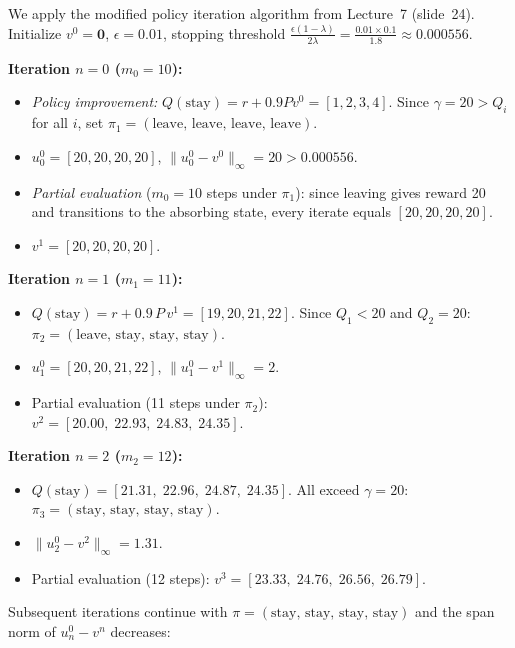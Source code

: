 \documentclass[12pt]{article}
\newcommand{\mat}[1]{\bm{#1}}
\begin{document}
We apply the modified policy iteration algorithm from Lecture~7 (slide~24). Initialize $v^0 = \mat{0}$, $\epsilon = 0.01$, stopping threshold $\frac{\epsilon(1-\lambda)}{2\lambda} = \frac{0.01 \times 0.1}{1.8} \approx 0.000556$.

\textbf{Iteration $n=0$ ($m_0 = 10$):}
\begin{itemize}[nosep]
  \item \emph{Policy improvement:} $Q(\text{stay}) = r + 0.9 P v^0 = [1, 2, 3, 4]$. Since $\gamma = 20 > Q_i$ for all $i$, set $\pi_1 = (\text{leave, leave, leave, leave})$.
  \item $u_0^0 = [20, 20, 20, 20]$, $\|u_0^0 - v^0\|_\infty = 20 > 0.000556$.
  \item \emph{Partial evaluation} ($m_0 = 10$ steps under $\pi_1$): since leaving gives reward 20 and transitions to the absorbing state, every iterate equals $[20, 20, 20, 20]$.
  \item $v^1 = [20, 20, 20, 20]$.
\end{itemize}

\textbf{Iteration $n=1$ ($m_1 = 11$):}
\begin{itemize}[nosep]
  \item $Q(\text{stay}) = r + 0.9\, P\, v^1 = [19, 20, 21, 22]$. Since $Q_1 < 20$ and $Q_2 = 20$:\\
        $\pi_2 = (\text{leave, stay, stay, stay})$.
  \item $u_1^0 = [20, 20, 21, 22]$, \;
        $\|u_1^0 - v^1\|_\infty = 2$.
  \item Partial evaluation (11 steps under $\pi_2$):\\
        $v^2 = [20.00,\; 22.93,\; 24.83,\; 24.35]$.
\end{itemize}

\textbf{Iteration $n=2$ ($m_2 = 12$):}
\begin{itemize}[nosep]
  \item $Q(\text{stay}) = [21.31,\; 22.96,\; 24.87,\; 24.35]$. All exceed $\gamma=20$:\\
        $\pi_3 = (\text{stay, stay, stay, stay})$.
  \item $\|u_2^0 - v^2\|_\infty = 1.31$.
  \item Partial evaluation (12 steps): $v^3 = [23.33,\; 24.76,\; 26.56,\; 26.79]$.
\end{itemize}

Subsequent iterations continue with $\pi = (\text{stay, stay, stay, stay})$ and the span norm of $u_n^0 - v^n$ decreases:
\end{document}
